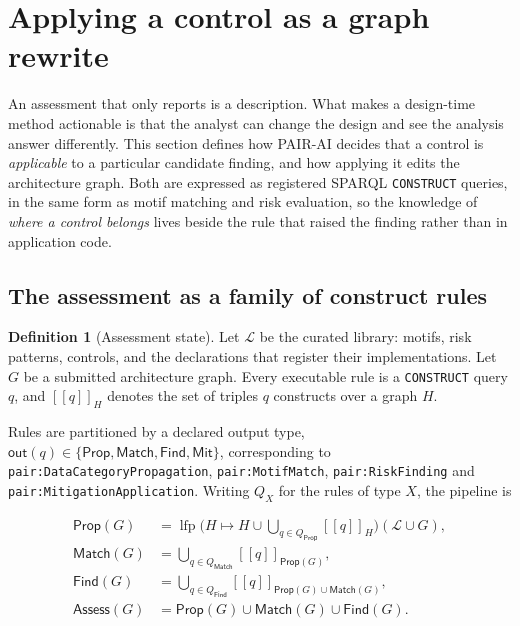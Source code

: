 \documentclass[11pt,a4paper]{article}
\theoremstyle{definition}
\newtheorem{definition}{Definition}
\theoremstyle{plain}
\newcommand{\Lib}{\mathcal{L}}
\newcommand{\Arch}{G}
\newcommand{\Match}{\mathsf{Match}}
\newcommand{\Find}{\mathsf{Find}}
\newcommand{\Prop}{\mathsf{Prop}}
\newcommand{\Assess}{\mathsf{Assess}}
\newcommand{\eval}[2]{[\![#1]\!]_{#2}}
\begin{document}
\section{Applying a control as a graph rewrite}
\label{sec:control-applicability}

An assessment that only reports is a description. What makes a design-time
method actionable is that the analyst can change the design and see the analysis
answer differently. This section defines how PAIR-AI decides that a control is
\emph{applicable} to a particular candidate finding, and how applying it edits
the architecture graph. Both are expressed as registered SPARQL
\texttt{CONSTRUCT} queries, in the same form as motif matching and risk
evaluation, so the knowledge of \emph{where a control belongs} lives beside the
rule that raised the finding rather than in application code.

\subsection{The assessment as a family of construct rules}

\begin{definition}[Assessment state]
Let $\Lib$ be the curated library: motifs, risk patterns, controls, and the
declarations that register their implementations. Let $\Arch$ be a submitted
architecture graph. Every executable rule is a \texttt{CONSTRUCT} query $q$,
and $\eval{q}{H}$ denotes the set of triples $q$ constructs over a graph $H$.
\end{definition}

Rules are partitioned by a declared output type,
$\mathsf{out}(q) \in \{\Prop, \Match, \Find, \mathsf{Mit}\}$, corresponding to
\texttt{pair:DataCategoryPropagation}, \texttt{pair:MotifMatch},
\texttt{pair:RiskFinding} and \texttt{pair:MitigationApplication}. Writing $Q_X$
for the rules of type $X$, the pipeline is

\begin{align}
  \Prop(\Arch)  &= \operatorname{lfp}\Big(H \mapsto H \cup \textstyle\bigcup_{q \in Q_\Prop} \eval{q}{H}\Big)(\Lib \cup \Arch), \label{eq:prop}\\
  \Match(\Arch) &= \textstyle\bigcup_{q \in Q_\Match} \eval{q}{\Prop(\Arch)}, \label{eq:match}\\
  \Find(\Arch)  &= \textstyle\bigcup_{q \in Q_\Find} \eval{q}{\Prop(\Arch) \cup \Match(\Arch)}, \label{eq:find}\\
  \Assess(\Arch) &= \Prop(\Arch) \cup \Match(\Arch) \cup \Find(\Arch). \label{eq:assess}
\end{align}
\end{document}
